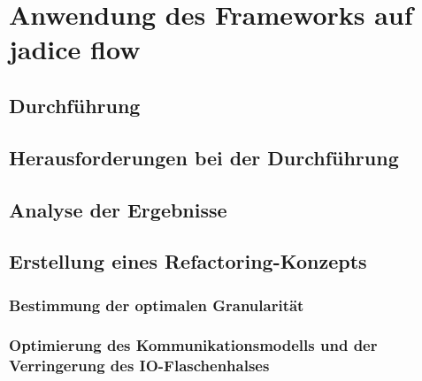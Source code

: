 \chapter{Anwendung des Frameworks auf jadice flow}
\label{chap:anwendung}

\section{Durchführung}
\section{Herausforderungen bei der Durchführung}
\section{Analyse der Ergebnisse}
\section{Erstellung eines Refactoring-Konzepts}
\subsection{Bestimmung der optimalen Granularität}
\subsection{Optimierung des Kommunikationsmodells und der Verringerung des IO-Flaschenhalses}
